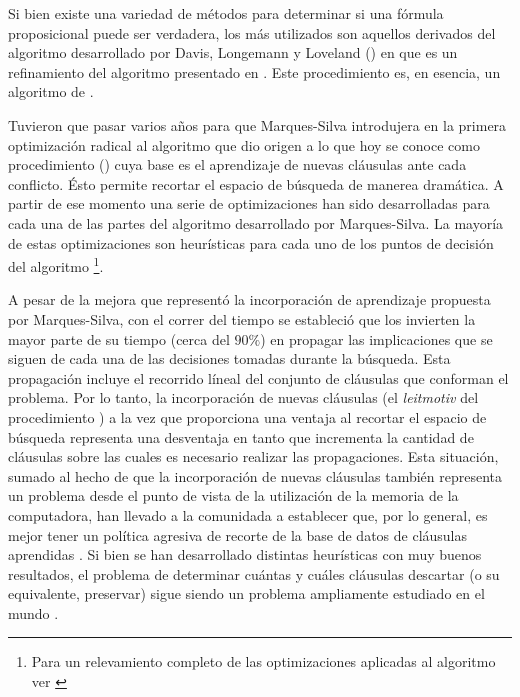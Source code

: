 Si bien existe una variedad de métodos para determinar si una fórmula
proposicional puede ser verdadera, los más utilizados son aquellos derivados
del algoritmo desarrollado por Davis, Longemann y Loveland (\dpll) en
\cite{Davis:1962:MPT:368273.368557} que es un refinamiento del algoritmo
presentado en \cite{Davis:1960:CPQ:321033.321034}. Este procedimiento es, en
esencia, un algoritmo de \bt.

Tuvieron que pasar varios años para que Marques-Silva introdujera en \cite
{marques-silva:iccad96} la primera optimización radical al algoritmo \dpll que
dio origen a lo que hoy se conoce como procedimiento \cdcl (\CDCL) cuya base
es el aprendizaje de nuevas cláusulas ante cada conflicto. Ésto permite
recortar el espacio de búsqueda de manerea dramática. A partir de ese momento
una serie de optimizaciones han sido desarrolladas para cada una de las partes
del algoritmo desarrollado por Marques-Silva. La mayoría de estas
optimizaciones  son heurísticas para cada uno de los
puntos de decisión del algoritmo \footnote{Para un relevamiento completo de
las optimizaciones aplicadas al algoritmo \CDCL ver \cite{manthey:mathesis}}.

A pesar de la mejora que representó la incorporación de aprendizaje propuesta
por Marques-Silva, con el correr del tiempo se estableció que los \ssolvers
invierten la mayor parte de su tiempo (cerca del $90\%$) en propagar las
implicaciones que se siguen de cada una de las decisiones tomadas durante la
búsqueda. Esta propagación incluye el recorrido líneal  del conjunto de cláusulas que conforman el problema. Por lo tanto,
la incorporación de nuevas cláusulas (el \emph{leitmotiv} del procedimiento
\CDCL) a la vez que proporciona una ventaja al recortar el espacio de búsqueda
representa una desventaja en tanto que incrementa la cantidad de cláusulas
sobre las cuales es necesario realizar las propagaciones. Esta situación,
sumado al hecho de que la incorporación de nuevas cláusulas también representa
un problema desde el punto de vista de la utilización de la memoria de la
computadora, han llevado a la comunidada a establecer que, por lo general, es
mejor tener un política agresiva de recorte de la base de datos de cláusulas
aprendidas \cite{Audemard:2009:PLC:1661445.1661509}. Si bien se han
desarrollado distintas heurísticas con muy buenos resultados, el problema de
determinar cuántas y cuáles cláusulas descartar (o su equivalente, preservar)
sigue siendo un problema ampliamente estudiado en el mundo \sat.

